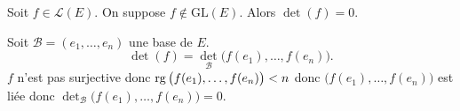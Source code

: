 \begin{prop}
	Soit $f \in \mathcal{L}(E)$. On suppose $f\not\in \mathrm{GL}(E)$. Alors $\det(f) = 0$.
\end{prop}

\begin{prv}
	Soit $\mathcal{B} = (e_1, \ldots, e_n)$ une base de $E$. \[
		\det(f) = \det_\mathcal{B}\big(f(e_1), \ldots, f(e_n)\big).
	\] $f$ n'est pas surjective donc $\operatorname{rg}\big(f(e_1), \ldots, f(e_n)\big) < n$ donc $\big(f(e_1), \ldots, f(e_n)\big)$ est liée donc $\det_\mathcal{B}\big(f(e_1), \ldots, f(e_n)\big) = 0$.
\end{prv}

